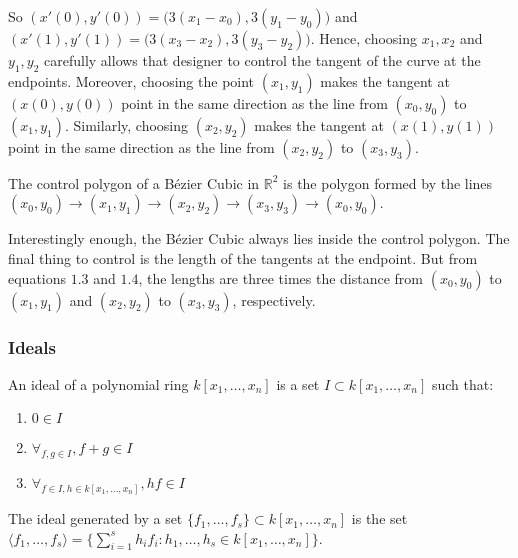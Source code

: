 \documentclass[../main.tex]{subfiles}
\begin{document}
%
So $(x'(0),y'(0)) = \big(3(x_1-x_0),3(y_1-y_0)\big)$ and $(x'(1),y'(1)) = \big(3(x_3-x_2),3(y_3-y_2)\big)$. Hence, choosing $x_1,x_2$ and $y_1,y_2$ carefully allows that designer to control the tangent of the curve at the endpoints. Moreover, choosing the point $(x_1,y_1)$ makes the tangent at $(x(0),y(0))$ point in the same direction as the line from $(x_0,y_0)$ to $(x_1,y_1)$. Similarly, choosing $(x_2,y_2)$ makes the tangent at $(x(1),y(1))$ point in the same direction as the line from $(x_2,y_2)$ to $(x_3,y_3)$.
%
\begin{definition}
The control polygon of a B\'{e}zier Cubic in $\mathbb{R}^2$ is the polygon formed by the lines $(x_0,y_0)\rightarrow(x_1,y_1)\rightarrow(x_2,y_2)\rightarrow(x_3,y_3)\rightarrow (x_0,y_0)$.
\end{definition}
%
Interestingly enough, the B\'{e}zier Cubic always lies inside the control polygon. The final thing to control is the length of the tangents at the endpoint. But from equations $1.3$ and $1.4$, the lengths are three times the distance from $(x_0,y_0)$ to $(x_1,y_1)$ and $(x_2,y_2)$ to $(x_3,y_3)$, respectively. 
%
\subsubsection{Ideals}
%
\begin{definition}
An ideal of a polynomial ring $k[x_1,\hdots ,x_n]$ is a set $I\subset k[x_1,\hdots ,x_n]$ such that:
\begin{enumerate}
\item $0\in I$
\item $\forall_{f,g\in I}, f+g\in I$ 
\item $\forall_{f\in I, h\in k[x_1,\hdots ,x_n]}, hf\in I$
\end{enumerate}
\end{definition}
%
\begin{definition}
The ideal generated by a set $\{f_1,\hdots, f_s\} \subset k[x_1,\hdots ,x_n]$ is the set $\langle f_1,\hdots, f_s\rangle = \{\sum_{i=1}^{s} h_i f_i:h_1,\hdots, h_s\in k[x_1,\hdots ,x_n]\}$.
\end{definition}
\end{document}
